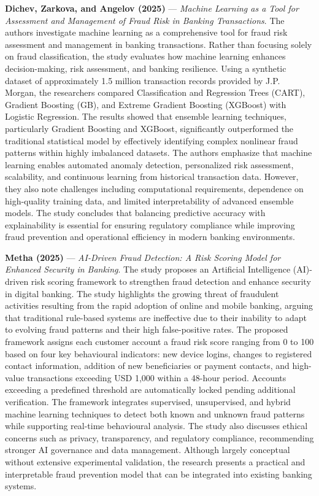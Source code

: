 \documentclass[conference]{IEEEtran}
\begin{document}
\par\medskip

\noindent\textbf{Dichev, Zarkova, and Angelov (2025)}\nocite{Dichev2025MLFraudRisk} --- \emph{Machine Learning as a Tool for Assessment and Management of Fraud Risk in Banking Transactions}. The authors investigate machine learning as a comprehensive tool for fraud risk assessment and management in banking transactions. Rather than focusing solely on fraud classification, the study evaluates how machine learning enhances decision-making, risk assessment, and banking resilience. Using a synthetic dataset of approximately 1.5 million transaction records provided by J.P. Morgan, the researchers compared Classification and Regression Trees (CART), Gradient Boosting (GB), and Extreme Gradient Boosting (XGBoost) with Logistic Regression. The results showed that ensemble learning techniques, particularly Gradient Boosting and XGBoost, significantly outperformed the traditional statistical model by effectively identifying complex nonlinear fraud patterns within highly imbalanced datasets. The authors emphasize that machine learning enables automated anomaly detection, personalized risk assessment, scalability, and continuous learning from historical transaction data. However, they also note challenges including computational requirements, dependence on high-quality training data, and limited interpretability of advanced ensemble models. The study concludes that balancing predictive accuracy with explainability is essential for ensuring regulatory compliance while improving fraud prevention and operational efficiency in modern banking environments.

\par\medskip

\noindent\textbf{Metha (2025)}\nocite{Metha2025RiskScoring} --- \emph{AI-Driven Fraud Detection: A Risk Scoring Model for Enhanced Security in Banking}. The study proposes an Artificial Intelligence (AI)-driven risk scoring framework to strengthen fraud detection and enhance security in digital banking. The study highlights the growing threat of fraudulent activities resulting from the rapid adoption of online and mobile banking, arguing that traditional rule-based systems are ineffective due to their inability to adapt to evolving fraud patterns and their high false-positive rates. The proposed framework assigns each customer account a fraud risk score ranging from 0 to 100 based on four key behavioural indicators: new device logins, changes to registered contact information, addition of new beneficiaries or payment contacts, and high-value transactions exceeding USD 1,000 within a 48-hour period. Accounts exceeding a predefined threshold are automatically locked pending additional verification. The framework integrates supervised, unsupervised, and hybrid machine learning techniques to detect both known and unknown fraud patterns while supporting real-time behavioural analysis. The study also discusses ethical concerns such as privacy, transparency, and regulatory compliance, recommending stronger AI governance and data management. Although largely conceptual without extensive experimental validation, the research presents a practical and interpretable fraud prevention model that can be integrated into existing banking systems.
\end{document}
